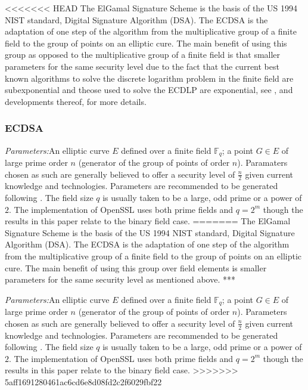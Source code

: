 \documentclass{llncs}
\newcommand{\F}{{\mathbb F}}
\begin{document}
<<<<<<< HEAD
The ElGamal Signature Scheme \cite{Elgamal85} is the basis of the US 1994 NIST standard, Digital Signature Algorithm (DSA). The ECDSA is the adaptation of one step of the algorithm from the multiplicative group of a finite field to the group of points on an elliptic cure. The main benefit of using this group as opposed to the multiplicative group of a finite field is that smaller parameters for the same security level \cite{koblitz87elliptic,miller85use} due to the fact that the current best known algorithms to solve the discrete logarithm problem in the finite field are subexponential and theose used to solve the ECDLP are exponential, see \cite{balasubramanian-koblitz,adelman-demarrais}, and developments thereof, for more details. 
\subsubsection{ECDSA}
\emph{Parameters:}\quad An elliptic curve $E$ defined over a finite field $\F_{q}$; a point $G\in E$ of large prime order $n$ (generator of the group of points of order $n$). Paramaters chosen as such are generally believed to offer a security level of $\frac{n}{2}$ given current knowledge and technologies. Parameters are recommended to be generated following \cite{fips}. The field size $q$ is usually taken to be a large, odd prime or a power of $2$. The implementation of OpenSSL uses both prime fields and $q=2^m$ though the results in this paper relate to the binary field case.
=======
The ElGamal Signature Scheme is the basis of the US 1994 NIST standard, Digital Signature Algorithm (DSA). The ECDSA is the adaptation of one step of the algorithm from the multiplicative group of a finite field to the group of points on an elliptic cure. The main benefit of using this group over field elements is smaller parameters for the same security level as mentioned above. ***

\emph{Parameters:}\quad An elliptic curve $E$ defined over a finite field $\F_{q}$; a point $G\in E$ of large prime order $n$ (generator of the group of points of order $n$). Parameters chosen as such are generally believed to offer a security level of $\frac{n}{2}$ given current knowledge and technologies. Parameters are recommended to be generated following \cite{fips}. The field size $q$ is usually taken to be a large, odd prime or a power of $2$. The implementation of OpenSSL uses both prime fields and $q=2^m$ though the results in this paper relate to the binary field case.
>>>>>>> 5aff1691280461ac6cd6e8d08fd2c2f6029fbf22
\end{document}
